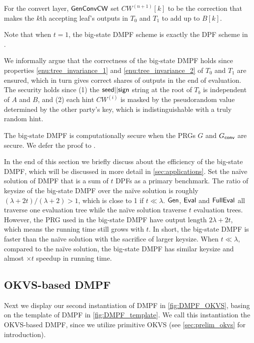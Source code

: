 For the convert layer, $\sf GenConvCW$ set $CW^{(n+1)}[k]$ to be the correction that makes the $k$th accepting leaf's outputs in $T_0$ and $T_1$ to add up to $B[k]$. 



\begin{remark}
  Note that when $t=1$, the big-state DMPF scheme is exactly the DPF scheme in \cite{CCS:BoyGilIsh16}. 
\end{remark}

We informally argue that the correctness of the big-state DMPF holds since properties \ref{enu:tree_invariance_1} and \ref{enu:tree_invariance_2} of $T_0$ and $T_1$ are ensured, which in turn gives correct shares of outputs in the end of evaluation. The security holds since (1) the ${\sf seed}||{\sf sign}$ string at the root of $T_b$ is independent of $A$ and $B$, and (2) each hint $CW^{(i)}$ is masked by the pseudorandom value determined by the other party's key, which is indistinguishable with a truly random hint. 

The big-state DMPF is computationally secure when the PRGs $G$ and $G_{\sf conv}$ are secure. We defer the proof to . 

In the end of this section we briefly discuss about the efficiency of the big-state DMPF, which will be discussed in more detail in \cref{sec:applications}. Set the na\"ive solution of DMPF that is a sum of $t$ DPFs as a primary benchmark. The ratio of keysize of the big-state DMPF over the na\"ive solution is roughly $(\lambda+2t)/(\lambda+2)>1$, which is close to 1 if $t\ll \lambda$. ${\sf Gen}$, ${\sf Eval}$ and ${\sf FullEval}$ all traverse one evaluation tree while the na\"ive solution traverse $t$ evaluation trees. However, the PRG used in the big-state DMPF have output length $2\lambda+2t$, which means the running time still grows with $t$. In short, the big-state DMPF is faster than the na\"ive solution with the sacrifice of larger keysize. When $t\ll\lambda$, compared to the na\"ive solution, the big-state DMPF has similar keysize and almost $\times t$ speedup in running time. 

\subsection{OKVS-based DMPF}\label{sec:OKVS_based_DMPF}
Next we display our second instantiation of DMPF in \cref{fig:DMPF_OKVS}, basing on the template of DMPF in \cref{fig:DMPF_template}. We call this instantiation the OKVS-based DMPF, since we utilize primitive OKVS (see \cref{sec:prelim_okvs} for introduction). 

